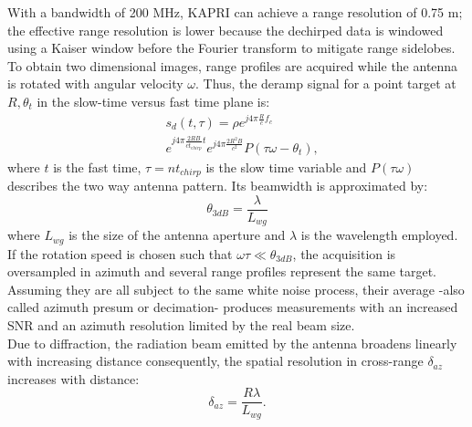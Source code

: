 With a bandwidth of 200 MHz, KAPRI can achieve a range resolution of 0.75 m\cite{Strozzi2011}; the effective range resolution is lower because the dechirped data is windowed using a Kaiser window before the Fourier transform to mitigate range sidelobes.\\
To obtain two dimensional images, range profiles are acquired while the antenna is rotated with angular velocity $\omega$. 
Thus, the deramp signal for a point target at $R,\theta_t$ in the slow-time versus fast time plane is:
\begin{equation}\label{eq:signal_model}
	\begin{aligned}
	& s_{d}\left(t,\tau\right) = \rho e^{j 4 \pi \frac{ R}{c}f_c}   \\
	& e^{j 4 \pi \frac{2 R B }{c t_{chirp}} t}  e^{j 4 \pi \frac{2 R^2 B}{c^2}} P\left(\tau \omega - \theta_t\right),
	\end{aligned}
\end{equation} 
where $t$ is the fast time, $\tau = n t_{chirp}$ is the slow time variable and $P\left(\tau \omega\right)$ describes the two way antenna pattern. Its beamwidth is approximated by:
\begin{equation}\label{eq:azimuth_resolution}
	\theta_{3dB} = \frac{\lambda}{L_{wg}}
\end{equation}
where $L_{wg}$ is the size of the antenna aperture and $\lambda$ is the wavelength employed.
If the rotation speed is chosen such that $\omega \tau \ll \theta_{3dB}$, the acquisition is oversampled in azimuth and several range profiles represent the same target. Assuming they are all subject to the same white noise process, their average -also called azimuth presum or decimation- produces measurements with an increased SNR and an azimuth resolution limited by the real beam size.\\ 
Due to diffraction, the radiation beam emitted by the antenna broadens linearly with increasing distance consequently, the spatial resolution in cross-range $\delta_{az}$ increases with distance:
\begin{equation}\label{eq:azimuth_ground_resolution}
	\delta_{az} = \frac{R \lambda}{L_{wg}}.
\end{equation}
